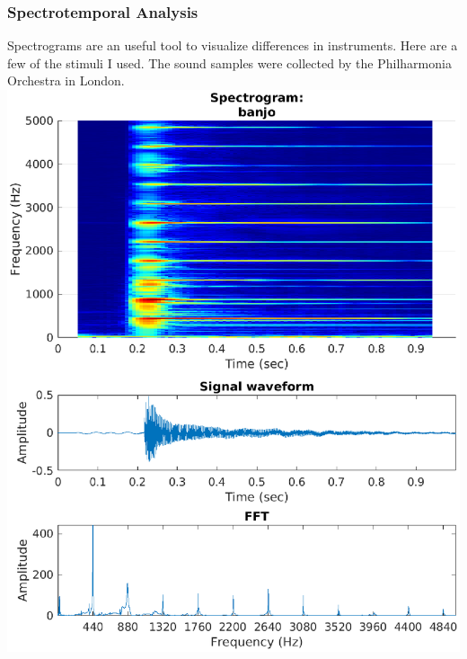 \documentclass[aspectratio=1610]{beamer}
\begin{document}
\begin{frame}
\frametitle{Spectrotemporal Analysis}
Spectrograms are an useful tool to visualize differences in instruments. Here are a few of the stimuli I used. The sound samples were collected by the Philharmonia Orchestra in London.\\ 
\vspace{.6em}
\centering
\includegraphics[height = .55\textheight]{spectrogram_banjo}

\end{frame}
\end{document}
